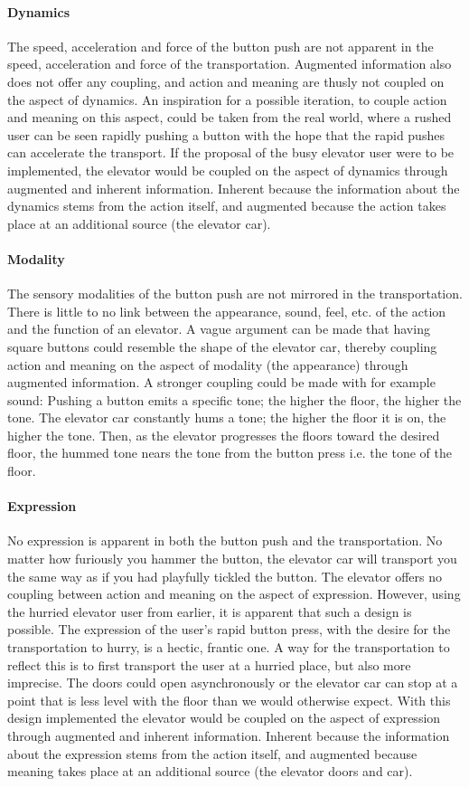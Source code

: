 \paragraph{Dynamics} The speed, acceleration and force of the button push are not apparent in the speed, acceleration and force of the transportation. Augmented information also does not offer any coupling, and action and meaning are thusly not coupled on the aspect of dynamics. An inspiration for a possible iteration, to couple action and meaning on this aspect, could be taken from the real world, where a rushed user can be seen rapidly pushing a button with the hope that the rapid pushes can accelerate the transport. If the proposal of the busy elevator user were to be implemented, the elevator would be coupled on the aspect of dynamics through augmented and inherent information. Inherent because the information about the dynamics stems from the action itself, and augmented because the action takes place at an additional source (the elevator car).
\paragraph{Modality} The sensory modalities of the button push are not mirrored in the transportation. There is little to no link between the appearance, sound, feel, etc. of the action and the function of an elevator. A vague argument can be made that having square buttons could resemble the shape of the elevator car, thereby coupling action and meaning on the aspect of modality (the appearance) through augmented information. A stronger coupling could be made with for example sound: Pushing a button emits a specific tone; the higher the floor, the higher the tone. The elevator car constantly hums a tone; the higher the floor it is on, the higher the tone. Then, as the elevator progresses the floors toward the desired floor, the hummed tone nears the tone from the button press i.e. the tone of the floor.
\paragraph{Expression} No expression is apparent in both the button push and the transportation. No matter how furiously you hammer the button, the elevator car will transport you the same way as if you had playfully tickled the button. The elevator offers no coupling between action and meaning on the aspect of expression. However, using the hurried elevator user from earlier, it is apparent that such a design is possible. The expression of the user's rapid button press, with the desire for the transportation to hurry, is a hectic, frantic one. A way for the transportation to reflect this is to first transport the user at a hurried place, but also more imprecise. The doors could open asynchronously or the elevator car can stop at a point that is less level with the floor than we would otherwise expect. With this design implemented the elevator would be coupled on the aspect of expression through augmented and inherent information. Inherent because the information about the expression stems from the action itself, and augmented because meaning takes place at an additional source (the elevator doors and car).

